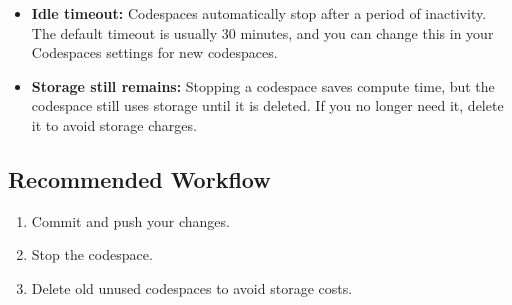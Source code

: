 \begin{itemize}
    \item \textbf{Idle timeout:} Codespaces automatically stop after a period of inactivity. The default timeout is usually 30 minutes, and you can change this in your Codespaces settings for new codespaces.
    \item \textbf{Storage still remains:} Stopping a codespace saves compute time, but the codespace still uses storage until it is deleted. If you no longer need it, delete it to avoid storage charges.
\end{itemize}

\subsection*{Recommended Workflow}

\begin{enumerate}
    \item Commit and push your changes.
    \item Stop the codespace.
    \item Delete old unused codespaces to avoid storage costs.
\end{enumerate}